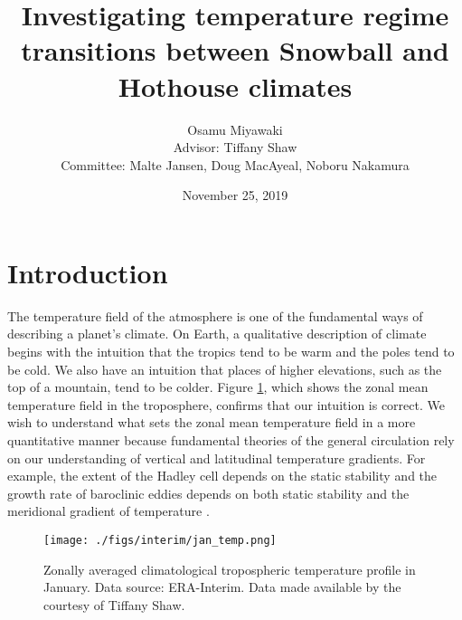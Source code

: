 \documentclass{article}
\title{Investigating temperature regime transitions between Snowball and Hothouse climates}
\author{Osamu Miyawaki \\ Advisor: Tiffany Shaw \\ Committee: Malte Jansen, Doug MacAyeal, Noboru Nakamura}
\date{November 25, 2019}
\begin{document}
\maketitle

\tableofcontents

\section{Introduction}

The temperature field of the atmosphere is one of the fundamental ways of describing a planet's climate. On Earth, a qualitative description of climate begins with the intuition that the tropics tend to be warm and the poles tend to be cold. We also have an intuition that places of higher elevations, such as the top of a mountain, tend to be colder. Figure \ref{fig:reanalysis}, which shows the zonal mean temperature field in the troposphere, confirms that our intuition is correct. We wish to understand what sets the zonal mean temperature field in a more quantitative manner because fundamental theories of the general circulation rely on our understanding of vertical and latitudinal temperature gradients. For example, the extent of the Hadley cell depends on the static stability \citep{held-hou-1980} and the growth rate of baroclinic eddies depends on both static stability and the meridional gradient of temperature \citep{charney-1947, eady-1949, phillips-1954}.

\begin{figure}
\centering
\texttt{[image: ./figs/interim/jan\_temp.png]}
\caption{Zonally averaged climatological tropospheric temperature profile in January. Data source: ERA-Interim. Data made available by the courtesy of Tiffany Shaw.}
\label{fig:reanalysis}
\end{figure}
\end{document}
